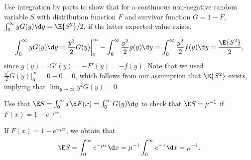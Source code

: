 \begin{exercise}
 Use integration by parts to show that for a continuous non-negative random
    variable $S$ with distribution function $F$ and survivor function $G=1-F$, 
$\int_0^\infty y G(y) \d y = \E{S^2}/2,$
if the latter expected value exists.
\begin{solution}
  \begin{equation}
      \int_0^\infty y G(y) \d y 
= \frac{y^2}2 G(y) \bigg|_0^\infty  - \int_0^\infty \frac{y^2}2 g(y)\d y = \int_0^\infty \frac{y^2}2 f(y)\d y = \frac{\E{S^2}}2,
  \end{equation}
  since $g(y) = G'(y) = - F'(y) = - f(y)$. Note that we used $\frac{y^2}2 G(y) \bigg|_0^\infty = 0 - 0 = 0$, which follows from our assumption that $\E{S^2}$ exists, implying that $\lim_{y \to \infty} y^2G(y) = 0$.
\end{solution}
\end{exercise}

\begin{exercise}
  Use that $\E S = \int_0^\infty x \d F(x) = \int_0^\infty G(y) \d y$ to
  check that  $\E S = \mu^{-1}$ if $F(x) = 1 - e^{-\mu x}$.
\begin{solution}
If $F(x) = 1 - e^{-\mu x}$, we obtain that 
\begin{equation*}
  \E S = \int_0^\infty e^{-\mu x} \d x =
  \mu^{-1}\int_0^\infty e^{-x} \d x = \mu^{-1}.
\end{equation*}
\end{solution}
\end{exercise}


